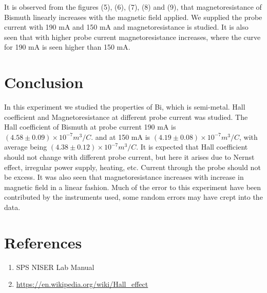 \documentclass[a4paper, amsfonts, amssymb, amsmath, reprint, showkeys, nofootinbib, twoside]{revtex4-1}
\begin{document}
It is observed from the figures (5), (6), (7), (8) and (9), that magnetoresistance of Bismuth linearly increases with the magnetic field applied. We supplied the probe current with 190 mA and 150 mA and magnetoresistance is studied. It is also seen that with higher probe current magnetoresistance increases, where the curve for 190 mA is seen higher than 150 mA.

\section{Conclusion}
In this experiment we studied the properties of Bi, which is semi-metal. Hall coefficient and Magnetoresistance at different probe current was studied.  The Hall coefficient of Bismuth at probe current 190 mA is $(4.58\pm0.09) \times10^{-7} m^3/C$. and at 150 mA is $(4.19\pm0.08) \times10^{-7} m^3/C$, with average being $(4.38\pm0.12) \times10^{-7} m^3/C$. It is expected that Hall coefficient should not change with different probe current, but here it arises due to Nernst effect, irregular power supply, heating, etc. Current through the probe should not be excess. It was also seen that magnetoresistance increases with increase in magnetic field in a linear fashion. Much of the error to this experiment have been contributed by the instruments used, some random errors may have crept into the data. 

\section{References}
\begin{enumerate}
\item{SPS NISER Lab Manual}
\item {\url{https://en.wikipedia.org/wiki/Hall_effect}}

\end{enumerate}
\end{document}
